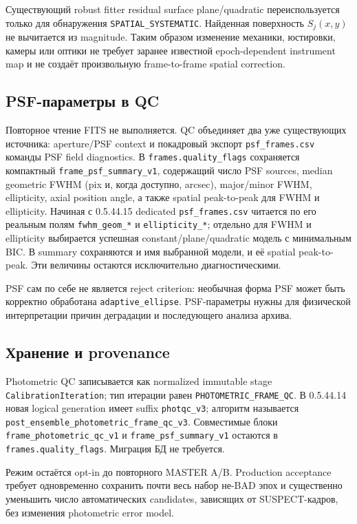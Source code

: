 Существующий robust fitter residual surface plane/quadratic переиспользуется только для обнаружения
\texttt{SPATIAL\_SYSTEMATIC}. Найденная поверхность $S_j(x,y)$ не вычитается из magnitude. Таким
образом изменение механики, юстировки, камеры или оптики не требует заранее известной epoch-dependent
instrument map и не создаёт произвольную frame-to-frame spatial correction.

\subsection{PSF-параметры в QC}

Повторное чтение FITS не выполняется. QC объединяет два уже существующих источника:
aperture/PSF context и покадровый экспорт \texttt{psf\_frames.csv} команды PSF field diagnostics.
В \texttt{frames.quality\_flags} сохраняется компактный \texttt{frame\_psf\_summary\_v1}, содержащий
число PSF sources, median geometric FWHM (pix и, когда доступно, arcsec), major/minor FWHM,
ellipticity, axial position angle, а также spatial peak-to-peak для FWHM и ellipticity. Начиная с
0.5.44.15 dedicated \texttt{psf\_frames.csv} читается по его реальным полям
\texttt{fwhm\_geom\_*} и \texttt{ellipticity\_*}; отдельно для FWHM и ellipticity выбирается успешная
constant/plane/quadratic модель с минимальным BIC. В summary сохраняются и имя выбранной модели, и её
spatial peak-to-peak. Эти величины остаются исключительно диагностическими.

PSF сам по себе не является reject criterion: необычная форма PSF может быть корректно обработана
\texttt{adaptive\_ellipse}. PSF-параметры нужны для физической интерпретации причин деградации и
последующего анализа архива.

\subsection{Хранение и provenance}

Photometric QC записывается как normalized immutable stage \texttt{CalibrationIteration};
тип итерации равен \texttt{PHOTOMETRIC\_FRAME\_QC}. В 0.5.44.14 новая logical generation имеет
suffix \texttt{photqc\_v3}; алгоритм называется
\texttt{post\_ensemble\_photometric\_frame\_qc\_v3}. Совместимые блоки
\texttt{frame\_photometric\_qc\_v1} и \texttt{frame\_psf\_summary\_v1} остаются в
\texttt{frames.quality\_flags}. Миграция БД не требуется.

Режим остаётся opt-in до повторного MASTER A/B. Production acceptance требует одновременно сохранить
почти весь набор не-BAD эпох и существенно уменьшить число автоматических candidates, зависящих от
SUSPECT-кадров, без изменения photometric error model.
